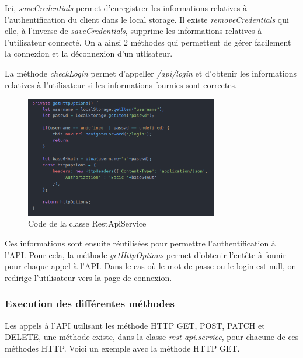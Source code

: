				Ici, \textit{saveCredentials} permet d'enregistrer les informations relatives à l'authentification du client dans le local storage. Il existe \textit{removeCredentials} qui elle, à l'inverse de \textit{saveCredentials}, supprime les informations relatives à l'utilisateur connecté. On a ainsi 2 méthodes qui permettent de gérer facilement la connexion et la déconnexion d'un utlisateur.

  				La méthode \textit{checkLogin} permet d'appeller \textit{/api/login} et d'obtenir les informations relatives à l'utilisateur si les informations fournies sont correctes.

				\begin{figure}[H]
					\centering\includegraphics[width=0.75\textwidth, keepaspectratio]{res/ionic-rest-httpoptions.png}
					\caption{Code de la classe RestApiService}
				\end{figure}

				Ces informations sont ensuite réutilisées pour permettre l'authentification à l'API. Pour cela, la méthode \textit{getHttpOptions} permet d'obtenir l'entête à founir pour chaque appel à l'API. Dans le cas où le mot de passe ou le login est null, on redirige l'utilisateur vers la page de connexion.

			\subsubsection{Execution des différentes méthodes}

				Les appels à l'API utilisant les méthode HTTP GET, POST, PATCH et DELETE, une méthode existe, dans la classe \textit{rest-api.service}, pour chacune de ces méthodes HTTP. Voici un exemple avec la méthode HTTP GET.

